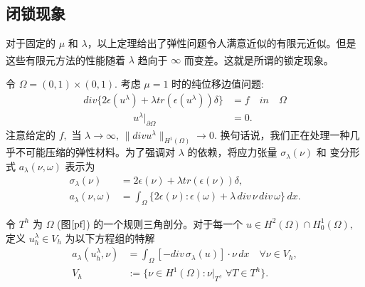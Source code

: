 \documentclass[a4paper,UTF8,titlepage,10pt]{ctexart}
\numberwithin{equation}{subsection}
\begin{document}
\subsection{闭锁现象}

	对于固定的 $\mu$ 和 $\lambda$，以上定理给出了弹性问题令人满意近似的有限元近似。但是这些有限元方法的性能随着 $\lambda$ 趋向于 $\infty$ 而变差。这就是所谓的锁定现象\textsuperscript{\cite{brenner2008mathematical}}。
	\par 
	令 $\Omega = (0,1) \times (0,1).$ 考虑 $\mu = 1$ 时的纯位移边值问题:
	\begin{equation}
	\begin{aligned}
		div \{ 2 \epsilon (u^{\lambda}) + \lambda tr (\epsilon (u^{\lambda})) \delta \} &= f \quad in \quad \Omega \\ \quad \quad \quad \quad \quad 
		u^{\lambda}|_{\partial \Omega} &=  0.
	\end{aligned}
	\end{equation}
	注意给定的 $f,$ 当 $\lambda \to \infty, \, \| div u^{\lambda} \|_{H^1(\Omega)} \to 0.$ 换句话说，我们正在处理一种几乎不可能压缩的弹性材料。为了强调对 $\lambda$ 的依赖，将应力张量 $\sigma_{\lambda}(\nu)$ 和 变分形式 $a_{\lambda}(\nu,\omega)$ 表示为
	\begin{equation}
	\begin{aligned}
		\sigma_{\lambda}(\nu) &= 2 \epsilon(\nu) + \lambda tr (\epsilon(\nu)) \delta ,\\
		a_{\lambda}(\nu,\omega) &= \int_{\Omega} \{ 2 \epsilon(\nu) : \epsilon(\omega) + \lambda \, div \, \nu \, div \, \omega \} \, dx.
	\end{aligned}
	\end{equation}
	
	令 $T^h$ 为 $\Omega $ (图$\ref{pf}$) 的一个规则三角剖分。对于每一个 $u \in H^2(\Omega) \cap H_0^1(\Omega),$ 定义 $u_h^{\lambda} \in V_h$ 为以下方程组的特解
	\begin{equation}
	\begin{aligned}
		a_{\lambda}(u_h^{\lambda},\nu) &= \int_{\Omega} 
		[ -div \, \sigma_{\lambda}(u) ] \cdot \nu \, dx \quad \forall \nu \in V_h, \\
		V_h &:= \{ \nu \in H^1(\Omega) : \nu |_{T}, \, \forall T \in T^h \}.
	\end{aligned}
	\end{equation}
	
\end{document}
